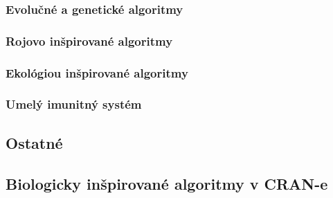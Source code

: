 \subsubsection*{Evolučné a genetické algoritmy}
\subsubsection*{Rojovo inšpirované algoritmy}
\subsubsection*{Ekológiou inšpirované algoritmy}
\subsubsection*{Umelý imunitný systém}
\subsection{Ostatné}


\subsection{Biologicky inšpirované algoritmy v CRAN-e}

